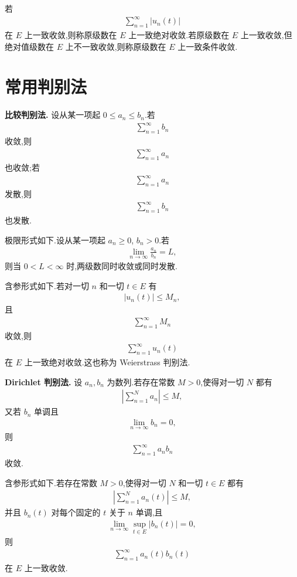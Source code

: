 若
\begin{align*}
	\sum_{n=1}^{\infty}|u_n(t)|
\end{align*}
在 $E$ 上一致收敛,则称原级数在 $E$ 上一致绝对收敛.若原级数在 $E$ 上一致收敛,但绝对值级数在 $E$ 上不一致收敛,则称原级数在 $E$ 上一致条件收敛.

\section{常用判别法}

\textbf{比较判别法.}
设从某一项起 $0\leq a_n\leq b_n$.若
\begin{align*}
	\sum_{n=1}^{\infty}b_n
\end{align*}
收敛,则
\begin{align*}
	\sum_{n=1}^{\infty}a_n
\end{align*}
也收敛;若
\begin{align*}
	\sum_{n=1}^{\infty}a_n
\end{align*}
发散,则
\begin{align*}
	\sum_{n=1}^{\infty}b_n
\end{align*}
也发散.

极限形式如下.设从某一项起 $a_n\geq0$, $b_n>0$.若
\begin{align*}
	\lim_{n\to\infty}\frac{a_n}{b_n}=L,
\end{align*}
则当 $0<L<\infty$ 时,两级数同时收敛或同时发散.

含参形式如下.若对一切 $n$ 和一切 $t\in E$ 有
\begin{align*}
	|u_n(t)|\leq M_n,
\end{align*}
且
\begin{align*}
	\sum_{n=1}^{\infty}M_n
\end{align*}
收敛,则
\begin{align*}
	\sum_{n=1}^{\infty}u_n(t)
\end{align*}
在 $E$ 上一致绝对收敛.这也称为 Weierstrass 判别法.

\textbf{Dirichlet 判别法.}
设 $a_n,b_n$ 为数列.若存在常数 $M>0$,使得对一切 $N$ 都有
\begin{align*}
	\left|\sum_{n=1}^N a_n\right|\leq M,
\end{align*}
又若 $b_n$ 单调且
\begin{align*}
	\lim_{n\to\infty}b_n=0,
\end{align*}
则
\begin{align*}
	\sum_{n=1}^{\infty}a_nb_n
\end{align*}
收敛.

含参形式如下.若存在常数 $M>0$,使得对一切 $N$ 和一切 $t\in E$ 都有
\begin{align*}
	\left|\sum_{n=1}^N a_n(t)\right|\leq M,
\end{align*}
并且 $b_n(t)$ 对每个固定的 $t$ 关于 $n$ 单调,且
\begin{align*}
	\lim_{n\to\infty}\sup_{t\in E}|b_n(t)|=0,
\end{align*}
则
\begin{align*}
	\sum_{n=1}^{\infty}a_n(t)b_n(t)
\end{align*}
在 $E$ 上一致收敛.

